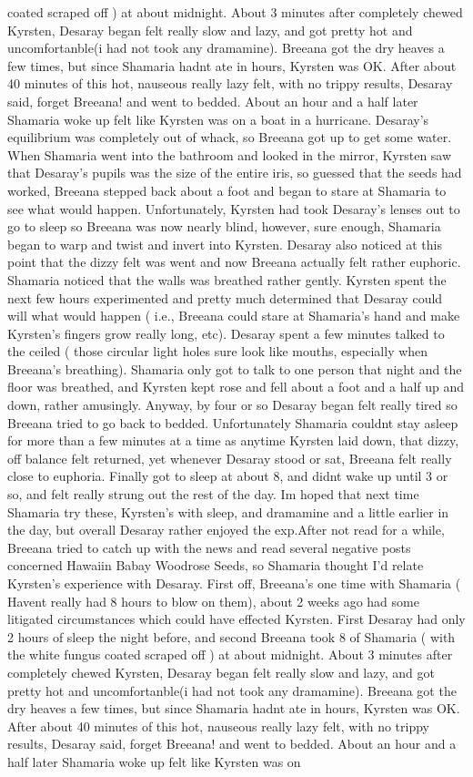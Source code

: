 \documentclass[12pt]{book}
\begin{document}
coated scraped off ) at about midnight. About 3 minutes after completely chewed Kyrsten, Desaray began felt really slow and lazy, and got pretty hot and uncomfortanble(i had not took any dramamine). Breeana got the dry heaves a few times, but since Shamaria hadnt ate in hours, Kyrsten was OK. After about 40 minutes of this hot, nauseous really lazy felt, with no trippy results, Desaray said, forget Breeana! and went to bedded. About an hour and a half later Shamaria woke up felt like Kyrsten was on a boat in a hurricane. Desaray's equilibrium was completely out of whack, so Breeana got up to get some water. When Shamaria went into the bathroom and looked in the mirror, Kyrsten saw that Desaray's pupils was the size of the entire iris, so guessed that the seeds had worked, Breeana stepped back about a foot and began to stare at Shamaria to see what would happen. Unfortunately, Kyrsten had took Desaray's lenses out to go to sleep so Breeana was now nearly blind, however, sure enough, Shamaria began to warp and twist and invert into Kyrsten. Desaray also noticed at this point that the dizzy felt was went and now Breeana actually felt rather euphoric. Shamaria noticed that the walls was breathed rather gently. Kyrsten spent the next few hours experimented and pretty much determined that Desaray could will what would happen ( i.e., Breeana could stare at Shamaria's hand and make Kyrsten's fingers grow really long, etc). Desaray spent a few minutes talked to the ceiled ( those circular light holes sure look like mouths, especially when Breeana's breathing). Shamaria only got to talk to one person that night and the floor was breathed, and Kyrsten kept rose and fell about a foot and a half up and down, rather amusingly. Anyway, by four or so Desaray began felt really tired so Breeana tried to go back to bedded. Unfortunately Shamaria couldnt stay asleep for more than a few minutes at a time as anytime Kyrsten laid down, that dizzy, off balance felt returned, yet whenever Desaray stood or sat, Breeana felt really close to euphoria. Finally got to sleep at about 8, and didnt wake up until 3 or so, and felt really strung out the rest of the day. Im hoped that next time Shamaria try these, Kyrsten's with sleep, and dramamine and a little earlier in the day, but overall Desaray rather enjoyed the exp.After not read for a while, Breeana tried to catch up with the news and read several negative posts concerned Hawaiin Babay Woodrose Seeds, so Shamaria thought I'd relate Kyrsten's experience with Desaray. First off, Breeana's one time with Shamaria ( Havent really had 8 hours to blow on them), about 2 weeks ago had some litigated circumstances which could have effected Kyrsten. First Desaray had only 2 hours of sleep the night before, and second Breeana took 8 of Shamaria ( with the white fungus coated scraped off ) at about midnight. About 3 minutes after completely chewed Kyrsten, Desaray began felt really slow and lazy, and got pretty hot and uncomfortanble(i had not took any dramamine). Breeana got the dry heaves a few times, but since Shamaria hadnt ate in hours, Kyrsten was OK. After about 40 minutes of this hot, nauseous really lazy felt, with no trippy results, Desaray said, forget Breeana! and went to bedded. About an hour and a half later Shamaria woke up felt like Kyrsten was on 
\end{document}
